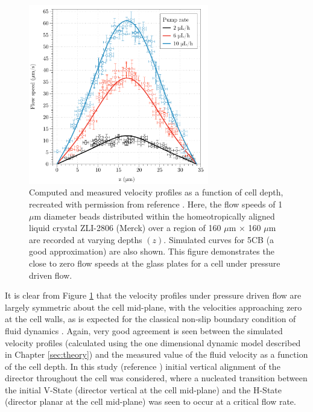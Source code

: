 \begin{figure}
\begin{center}
\includegraphics[width=0.7\textwidth]{Figures/45/sharon_flow}
\end{center}
\caption[Computed and measured velocity profiles as a function of cell depth]{\label{fig:sharon_flow}Computed and measured velocity profiles as a function of cell depth, recreated with permission from reference \cite{Jewell2009}. Here, the flow speeds of 1 $\mu$m diameter beads distributed within the homeotropically aligned liquid crystal ZLI-2806 (Merck) over a region of 160 $\mu$m $\times$ 160 $\mu$m are recorded at varying depths $\left(z\right)$. Simulated curves for 5CB (a good approximation) are also shown. This figure demonstrates the close to zero flow speeds at the glass plates for a cell under pressure driven flow.}
\end{figure}

It is clear from Figure \ref{fig:sharon_flow} that the velocity profiles under pressure driven flow are largely symmetric about the cell mid-plane, with the velocities approaching zero at the cell walls, as is expected for the classical non-slip boundary condition of fluid dynamics \cite{Feynmann1964}. Again, very good agreement is seen between the simulated velocity profiles (calculated using the one dimensional dynamic model described in Chapter \ref{sec:theory}) and the measured value of the fluid velocity as a function of the cell depth. In this study (reference \cite{Jewell2009}) initial vertical alignment of the director throughout the cell was considered, where a nucleated transition between the initial V-State (director vertical at the cell mid-plane) and the H-State (director planar at the cell mid-plane) was seen to occur at a critical flow rate.

